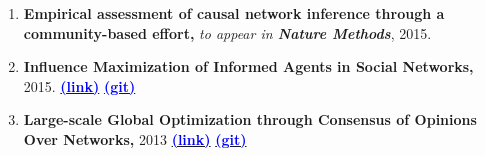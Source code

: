 \documentclass[letter]{res}
\begin{document}
\begin{resume}
\begin{enumerate}[leftmargin=-.01in]
\item \textbf{Empirical assessment of causal network inference through a community-based effort,} \textit{to appear in \textbf{Nature Methods}}, 2015.

\item \textbf{Influence Maximization of Informed Agents in Social Networks,} 2015.
{\href{http://dx.doi.org/10.1016/j.amc.2014.12.139}{\textbf{\textcolor{blue}{(link)}}}}
{\href{https://github.com/omid55/influence_maximization}{\textbf{\textcolor{blue}{(git)}}}}

\item \textbf{Large-scale Global Optimization through Consensus of Opinions Over Networks,} 2013 {\href{http://www.casmodeling.com/content/1/1/11}{\textbf{\textcolor{blue}{(link)}}}}
{\href{https://github.com/omid55/optimization_opinion_formation}{\textbf{\textcolor{blue}{(git)}}}}



\end{enumerate}
\end{resume}
\end{document}
